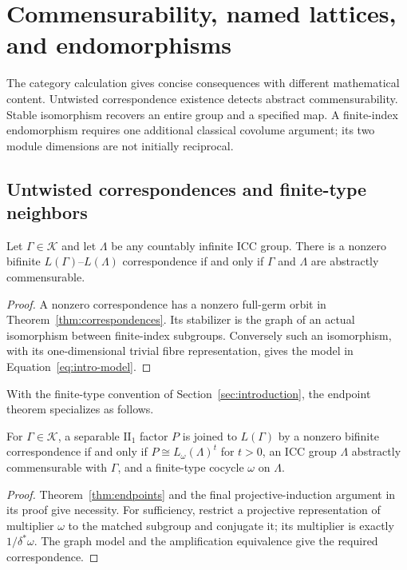 \section{Commensurability, named lattices, and endomorphisms}
\label{sec:examples}

The category calculation gives concise consequences with different
mathematical content. Untwisted correspondence existence detects abstract
commensurability. Stable isomorphism recovers an entire group and a
specified map. A finite-index endomorphism requires one additional
classical covolume argument; its two module dimensions are not initially
reciprocal.

\subsection{Untwisted correspondences and finite-type neighbors}

\begin{corollary}\label{cor:commensurability}
Let $\Gamma\in\mathscr K$ and let $\Lambda$ be any countably infinite
ICC group. There is a nonzero bifinite $L(\Gamma)$--$L(\Lambda)$
correspondence if and only if $\Gamma$ and $\Lambda$ are abstractly
commensurable.
\end{corollary}
\begin{proof}
A nonzero correspondence has a nonzero full-germ orbit in
Theorem~\ref{thm:correspondences}. Its stabilizer is the graph of an
actual isomorphism between finite-index subgroups. Conversely such an
isomorphism, with its one-dimensional trivial fibre representation,
gives the model in Equation~\eqref{eq:intro-model}.
\end{proof}

With the finite-type convention of Section~\ref{sec:introduction},
the endpoint theorem specializes as follows.
\begin{corollary}\label{cor:untwisted-neighbors}
For $\Gamma\in\mathscr K$, a separable $\mathrm{II}_1$ factor $P$ is
joined to $L(\Gamma)$ by a nonzero bifinite correspondence if and only if
$P\cong L_\omega(\Lambda)^t$ for $t>0$, an ICC group $\Lambda$
abstractly commensurable with $\Gamma$, and a finite-type cocycle
$\omega$ on $\Lambda$.
\end{corollary}
\begin{proof}
Theorem~\ref{thm:endpoints} and the final projective-induction argument
in its proof give necessity. For sufficiency, restrict a projective
representation of multiplier $\omega$ to the matched subgroup and
conjugate it; its multiplier is exactly $1/\delta^*\omega$. The graph
model and the amplification equivalence give the required correspondence.
\end{proof}

